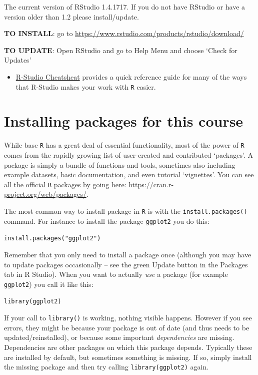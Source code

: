 \documentclass[
]{book}
\providecommand{\tightlist}{%
  \setlength{\itemsep}{0pt}\setlength{\parskip}{0pt}}
\begin{document}
The current version of RStudio 1.4.1717. If you do not have RStudio or have a version older than 1.2 please install/update.

\textbf{TO INSTALL}: go to \url{https://www.rstudio.com/products/rstudio/download/}

\textbf{TO UPDATE}: Open RStudio and go to Help Menu and choose `Check for Updates'

\begin{itemize}
\tightlist
\item
  \href{https://github.com/rstudio/cheatsheets/raw/master/rstudio-ide.pdf}{R-Studio Cheatsheat} provides a quick reference guide for many of the ways that R-Studio makes your work with \texttt{R} easier.
\end{itemize}

\hypertarget{installing-packages-for-this-course}{%
\chapter*{Installing packages for this course}\label{installing-packages-for-this-course}}

While base \texttt{R} has a great deal of essential functionality, most of the power of \texttt{R} comes from the rapidly growing list of user-created and contributed `packages'. A package is simply a bundle of functions and tools, sometimes also including example datasets, basic documentation, and even tutorial `vignettes'. You can see all the official \texttt{R} packages by going here: \url{https://cran.r-project.org/web/packages/}.

The most common way to install package in \texttt{R} is with the \texttt{install.packages()} command. For instance to install the package \texttt{ggplot2} you do this:

\texttt{install.packages("ggplot2")}

Remember that you only need to install a package once (although you may have to update packages occasionally -- see the green Update button in the Packages tab in R Studio). When you want to actually \emph{use} a package (for example \texttt{ggplot2}) you call it like this:

\texttt{library(ggplot2)}

If your call to \texttt{library()} is working, nothing visible happens. However if you see errors, they might be because your package is out of date (and thus needs to be updated/reinstalled), or because some important \emph{dependencies} are missing. Dependencies are other packages on which this package depends. Typically these are installed by default, but sometimes something is missing. If so, simply install the missing package and then try calling \texttt{library(ggplot2)} again.
\end{document}
